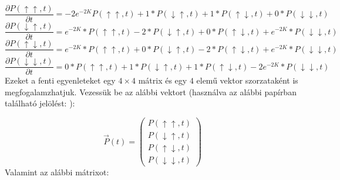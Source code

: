 \begin{equation} \label{eq:18}
    \frac{\partial P \left( \uparrow \uparrow, t \right)}{\partial t}
    =
    -2 e^{-2 K} P \left( \uparrow \uparrow, t \right)
    +
    1 * P \left( \downarrow \uparrow, t \right)
    +
    1 * P \left( \uparrow \downarrow, t \right)
    +
    0 * P \left( \downarrow \downarrow, t \right)
\end{equation}
\begin{equation} \label{eq:19}
    \frac{\partial P \left( \downarrow \uparrow, t \right)}{\partial t}
    =
    e^{-2 K} * P \left( \uparrow \uparrow, t \right)
    -
    2 * P \left( \downarrow \uparrow, t \right)
    +
    0 * P \left( \uparrow \downarrow, t \right)
    +
    e^{-2 K} * P \left( \downarrow \downarrow, t \right)
\end{equation}
\begin{equation} \label{eq:20}
    \frac{\partial P \left( \uparrow \downarrow, t \right)}{\partial t}
    =
    e^{-2 K} * P \left( \uparrow \uparrow, t \right)
    +
    0 * P \left( \downarrow \uparrow, t \right)
    -
    2 * P \left( \uparrow \downarrow, t \right)
    +
    e^{-2 K} * P \left( \downarrow \downarrow, t \right)
\end{equation}
\begin{equation} \label{eq:21}
    \frac{\partial P \left( \downarrow \downarrow, t \right)}{\partial t}
    =
    0 * P \left( \uparrow \uparrow, t \right)
    +
    1 * P \left( \downarrow \uparrow, t \right)
    +
    1 * P \left( \uparrow \downarrow, t \right)
    -
    2 e^{-2 K} * P \left( \downarrow \downarrow, t \right)
\end{equation}
Ezeket a fenti egyenleteket egy $4 \times 4$ mátrix és egy $4$ elemű vektor szorzataként is megfogalamzhatjuk. Vezessük be az alábbi vektort (használva az alábbi papírban található jelölést: \cite{heatbath}):

\begin{equation} \label{eq:22}
    \vec{P} \left( t \right)
    =
    \begin{pmatrix}
        P \left( \uparrow \uparrow, t \right) \\
        P \left( \downarrow \uparrow, t \right) \\
        P \left( \uparrow \downarrow, t \right) \\
        P \left( \downarrow \downarrow, t \right)
    \end{pmatrix}
\end{equation}
Valamint az alábbi mátrixot:

